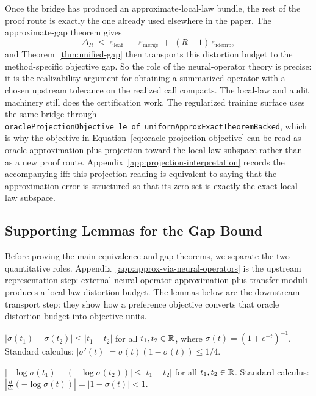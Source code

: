 Once the bridge has produced an approximate-local-law bundle, the rest
of the proof route is exactly the one already used elsewhere in the
paper. The approximate-gap theorem gives
\[
\Delta_R \;\le\;
\varepsilon_{\mathrm{leaf}}
\;+\;
\varepsilon_{\mathrm{merge}}
\;+\;
(R-1)\,\varepsilon_{\mathrm{idemp}},
\]
and Theorem~\ref{thm:unified-gap} then transports this distortion budget to
the method-specific objective gap. So the role of the neural-operator theory
is precise: it is the realizability argument for obtaining a summarized
operator with a chosen upstream tolerance on the realized call compacts.
The local-law and audit machinery still does the certification work.
The regularized training surface uses the same bridge through
\texttt{oracleProjectionObjective\_le\_of\_uniformApproxExactTheoremBacked},
which is why the objective in Equation~\eqref{eq:oracle-projection-objective}
can be read as oracle approximation plus projection toward the local-law
subspace rather than as a new proof route. Appendix~\ref{app:projection-interpretation}
records the accompanying iff: this projection reading is equivalent to
saying that the approximation error is structured so that its zero set is
exactly the exact local-law subspace.

\subsection{Supporting Lemmas for the Gap Bound}\label{app:supporting-lemmas}

Before proving the main equivalence and gap theorems, we separate the two quantitative roles. Appendix~\ref{app:approx-via-neural-operators} is the upstream representation step: external neural-operator approximation plus transfer moduli produces a local-law distortion budget. The lemmas below are the downstream transport step: they show how a preference objective converts that oracle distortion budget into objective units.

\begin{lemma}\label{lem:sigmoid-lip}
$|\sigma(t_1) - \sigma(t_2)| \le |t_1 - t_2|$ for all $t_1, t_2 \in \mathbb{R}$, where $\sigma(t) = (1 + e^{-t})^{-1}$. Standard calculus: $|\sigma'(t)| = \sigma(t)(1-\sigma(t)) \le 1/4$.
\end{lemma}

\begin{lemma}\label{lem:neglogsig-lip}
$|{-}\log\sigma(t_1) - ({-}\log\sigma(t_2))| \le |t_1 - t_2|$ for all $t_1, t_2 \in \mathbb{R}$. Standard calculus: $|\frac{d}{dt}(-\log\sigma(t))| = |1 - \sigma(t)| < 1$.
\end{lemma}

